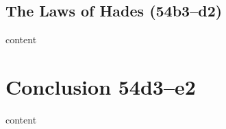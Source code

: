 \documentclass[11pt]{article}
\begin{document}
\subsection{The Laws of Hades (54b3--d2)}

content


\section{Conclusion 54d3--e2}

content

\newpage


\end{document}

